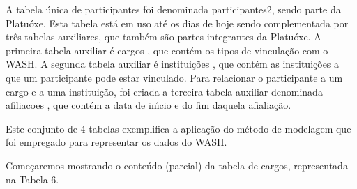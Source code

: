 \documentclass[
12pt,		%
openright,	%
twoside,  %
a4paper,			%
chapter=TITLE,		%
english,			%
french,				%
spanish,			%
brazil				%
]{USPSC-classe/USPSC}
\begin{document}
A tabela \'unica de participantes foi denominada \textquotedbl participantes2\textquotedbl , sendo parte da  \textquotedbl Platu\'oxe\textquotedbl . Esta tabela est\'a em uso at\'e os dias de hoje sendo complementada por tr\^es tabelas auxiliares, que tamb\'em s\~ao partes integrantes da \textquotedbl Platu\'oxe\textquotedbl . A primeira tabela auxiliar \'e \textquotedbl cargos \textquotedbl , que cont\'em os tipos de vincula\c{c}\~ao com o WASH. A segunda tabela auxiliar \'e \textquotedbl institui\c{c}\~oes \textquotedbl , que cont\'em as institui\c{c}\~oes a que um participante pode estar vinculado. Para relacionar o participante a um cargo e a uma institui\c{c}\~ao, foi criada a terceira tabela auxiliar denominada \textquotedbl afiliacoes \textquotedbl , que cont\'em a data de in\'{\i}cio e do fim daquela afialia\c{c}\~ao.

















Este conjunto de 4 tabelas exemplifica a aplica\c{c}\~ao do m\'etodo de modelagem que foi empregado para representar os dados do WASH.

















Come\c{c}aremos mostrando o conte\'udo (parcial) da tabela de \textquotedbl cargos\textquotedbl , representada na Tabela 6.
\end{document}
